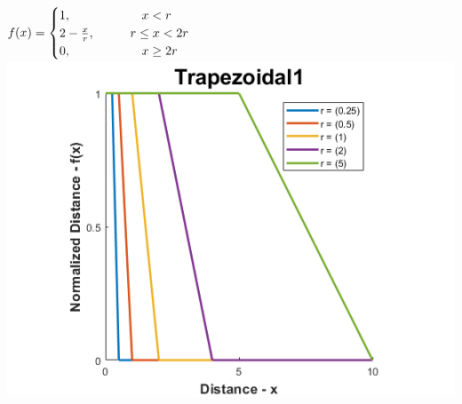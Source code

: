 \documentclass[12pt, a4paper, titlepage, openany]{book}
\begin{document}
\begin{description}[labelsep=1cm, labelwidth=2cm, nosep,,style=multiline,leftmargin=3cm]
\begin{description}[labelsep=14em, labelwidth=10em, nosep,style=multiline,leftmargin=6cm]
	\item[\texttt{"trapezoidal1"}]	  $f(x) = \begin{cases} 1,  \hspace{20mm}  x<r 
	\\ 2 - \frac{x}{r},  \hspace{10mm} r\le x<2r 
	\\ 0,  \hspace{20mm}  x\ge 2r \end{cases}$\\
		\includegraphics[scale=.5]{FuzzTrap1v1.png} \\ 


\end{description}
\end{description}
\end{document}
